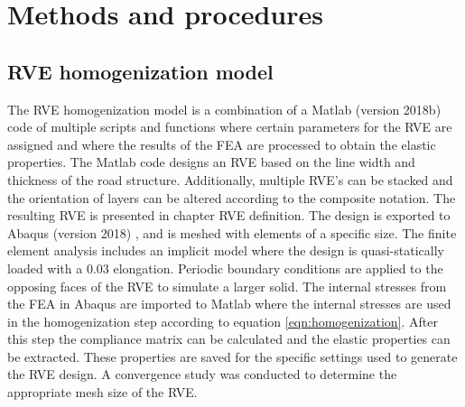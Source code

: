\section{Methods and procedures}
\subsection{RVE homogenization model}
The RVE homogenization model is a combination of a Matlab (version 2018b) code of multiple scripts and functions where certain parameters for the RVE are assigned and where the results of the FEA are processed to obtain the elastic properties. The Matlab code designs an RVE based on the line width and thickness of the road structure. Additionally,  multiple RVE's can be stacked and the orientation of  layers can be altered according to the composite notation. The resulting RVE is presented in chapter RVE definition. The design is exported to Abaqus (version 2018) , and is meshed with elements of a specific size. The finite element analysis includes an implicit model where the design is quasi-statically loaded with a 0.03 elongation. Periodic boundary conditions are applied to the opposing faces of the RVE to simulate a larger solid. The internal stresses from the FEA in Abaqus are imported to Matlab where the internal stresses are used in the homogenization step according to equation \ref{eqn:homogenization}. After this step the compliance matrix can be calculated and the elastic properties can be extracted. These properties are saved for the specific settings used to generate the RVE design. 
A convergence study was conducted to determine the appropriate mesh size of the RVE. 



